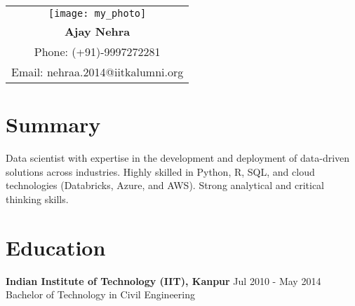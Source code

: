 \documentclass[a4paper,10pt]{article}
\begin{document}
\begin{center}
    \textcolor{headerfg}{\bfseries\Large\setlength{\fboxsep}{0pt}\colorbox{headerbg}{%
    \begin{tabular}{@{}c@{}}
        \texttt{[image: my\_photo]} \\
        \vspace{0.5cm} %
        \textcolor{headerfg}{\bfseries\Large Ajay Nehra} \\
        \small Phone: (+91)-9997272281 \\
        \small Email: nehraa.2014@iitkalumni.org
    \end{tabular}%
    }}
\end{center}

\section*{Summary}
Data scientist with expertise in the development and deployment of data-driven solutions across industries. Highly skilled in Python, R, SQL, and cloud technologies (Databricks, Azure, and AWS). Strong analytical and critical thinking skills.

\section*{Education}
\textbf{Indian Institute of Technology (IIT), Kanpur} \hfill \textnormal{Jul 2010 - May 2014} \\
Bachelor of Technology in Civil Engineering

\end{document}
